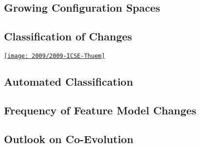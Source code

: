 \subsection{Growing Configuration Spaces}
\subsection{Classification of Changes}
\begin{frame}{\insertsubsection}
	\begin{mycolumns}
		\href{https://github.com/SoftVarE-Group/Papers/blob/main/2009/2009-ICSE-Thuem.pdf}{\texttt{[image: 2009/2009-ICSE-Thuem]}}
	\mynextcolumn
	\end{mycolumns}
\end{frame}
\subsection{Automated Classification}
\subsection{Frequency of Feature Model Changes}
\subsection{Outlook on Co-Evolution}
\lessonslearned{
	\item \ldots
}{
	\item \ldots
}{
	\ldots
}

